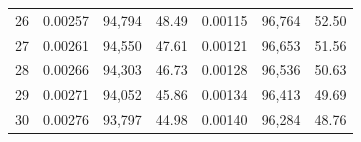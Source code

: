 \begin{tabular}{cccc|ccc}
26   & 0.00257                                                          & 94,794                                                                                            & 48.49                                                                                                                      & 0.00115                                                          & 96,764                                                                                            & 52.50                                                                                                                      \\
27   & 0.00261                                                          & 94,550                                                                                            & 47.61                                                                                                                      & 0.00121                                                          & 96,653                                                                                            & 51.56                                                                                                                      \\
28   & 0.00266                                                          & 94,303                                                                                            & 46.73                                                                                                                      & 0.00128                                                          & 96,536                                                                                            & 50.63                                                                                                                      \\
29   & 0.00271                                                          & 94,052                                                                                            & 45.86                                                                                                                      & 0.00134                                                          & 96,413                                                                                            & 49.69                                                                                                                      \\
30   & 0.00276                                                          & 93,797                                                                                            & 44.98                                                                                                                      & 0.00140                                                          & 96,284                                                                                            & 48.76                                                                                                                      \\

\end{tabular}
